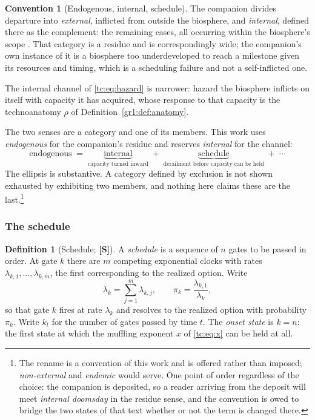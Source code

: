\documentclass[11pt]{article}
\numberwithin{equation}{section}
\theoremstyle{plain}
\theoremstyle{definition}
\newtheorem{definition}[theorem]{Definition}
\newtheorem{convention}[theorem]{Convention}
\theoremstyle{remark}
\begin{document}
\begin{convention}[Endogenous, internal, schedule]\label{sch:conv:internal}
The companion divides departure into \emph{external}, inflicted from
outside the biosphere, and \emph{internal}, defined there as the
complement: the remaining cases, all occurring within the biosphere's
scope \cite{Nexus}. That category is a residue and is correspondingly
wide; the companion's own instance of it is a biosphere too
underdeveloped to reach a milestone given its resources and timing,
which is a scheduling failure and not a self-inflicted one.

The internal channel of \eqref{tc:eq:hazard} is narrower: hazard the
biosphere inflicts on itself with capacity it has acquired, whose
response to that capacity is the technoanatomy $\rho$ of
Definition~\ref{gr1:def:anatomy}.

The two senses are a category and one of its members. This work uses
\emph{endogenous} for the companion's residue and reserves
\emph{internal} for the channel:
\begin{equation}\label{sch:eq:partition}
\text{endogenous}\;=\;\underbrace{\text{internal}}_{\text{capacity
turned inward}}\;+\;\underbrace{\text{schedule}}_{\text{derailment
before capacity can be held}}\;+\;\cdots
\end{equation}
The ellipsis is substantive. A category defined by exclusion is not
shown exhausted by exhibiting two members, and nothing here claims these
are the last.\footnote{The rename is a convention of this work and is
offered rather than imposed; \emph{non-external} and \emph{endemic}
would serve. One point of order regardless of the choice: the companion
is deposited, so a reader arriving from the deposit will meet
\emph{internal doomsday} in the residue sense, and the convention is
owed to bridge the two states of that text whether or not the term is
changed there.}
\end{convention}

\subsubsection{The schedule}\label{sch:subsub:model}

\begin{definition}[Schedule; \textbf{[S]}]\label{sch:def:schedule}
A \emph{schedule} is a sequence of $n$ gates to be passed in order. At
gate $k$ there are $m$ competing exponential clocks with rates
$\lambda_{k,1},\dots,\lambda_{k,m}$, the first corresponding to the
realized option. Write
\begin{equation}\label{sch:eq:clocks}
\lambda_k=\sum_{j=1}^{m}\lambda_{k,j},
\qquad
\pi_k=\frac{\lambda_{k,1}}{\lambda_k},
\end{equation}
so that gate $k$ fires at rate $\lambda_k$ and resolves to the realized
option with probability $\pi_k$. Write $k_t$ for the number of gates
passed by time $t$. The \emph{onset state} is $k=n$: the first state at
which the muffling exponent $x$ of \eqref{tc:eq:x} can be held at all.
\end{definition}
\end{document}

